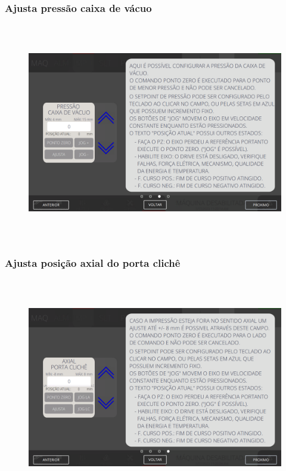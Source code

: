 \newpage
\thispagestyle{fancy}
\vspace*{40 pt}
\subsubsection{\small{Ajusta pressão caixa de vácuo}}
\vspace*{\fill}
\begin{figure}[h]
  \centering
  \includegraphics[width=576px,height=360px]{src/imagesFlexo/04-printter/02-printter/settings/e-3.png}
\end{figure}
\vspace*{\fill}

\newpage
\thispagestyle{fancy}
\vspace*{40 pt}
\subsubsection{\small{Ajusta posição axial do porta clichê}}
\vspace*{\fill}
\begin{figure}[h]
  \centering
  \includegraphics[width=576px,height=360px]{src/imagesFlexo/04-printter/02-printter/settings/e-4.png}
\end{figure}
\vspace*{\fill}
